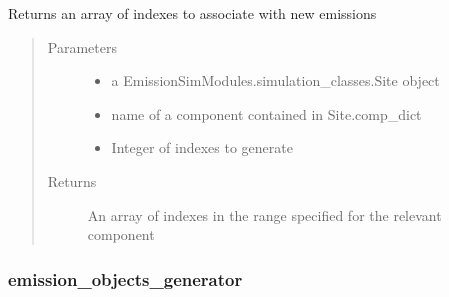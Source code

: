 \documentclass[letterpaper,10pt,english]{sphinxmanual}
\begin{document}
\begin{fulllineitems}
\label{\detokenize{index:feast.EmissionSimModules.emission_class_functions.comp_indexes_fcn}}
Returns an array of indexes to associate with new emissions
\begin{quote}\begin{description}
\item[{Parameters}] \leavevmode\begin{itemize}
\item {} 
 \textendash{} a EmissionSimModules.simulation\_classes.Site object

\item {} 
 \textendash{} name of a component contained in Site.comp\_dict

\item {} 
 \textendash{} Integer of indexes to generate

\end{itemize}

\item[{Returns}] \leavevmode
An array of indexes in the range specified for the relevant component

\end{description}\end{quote}

\end{fulllineitems}



\subsubsection{emission\_objects\_generator}
\label{\detokenize{index:emission-objects-generator}}
\end{document}
